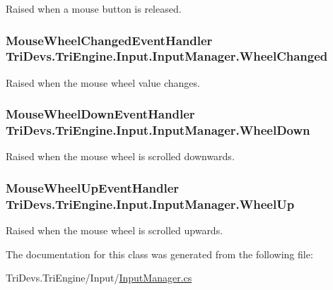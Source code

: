 Raised when a mouse button is released. 

\hypertarget{class_tri_devs_1_1_tri_engine_1_1_input_1_1_input_manager_aac9309268ee75ae4e5b29fde1ba7aec6}{
\subsubsection[{Wheel\-Changed}]{\setlength{\rightskip}{0pt plus 5cm}Mouse\-Wheel\-Changed\-Event\-Handler Tri\-Devs.\-Tri\-Engine.\-Input.\-Input\-Manager.\-Wheel\-Changed}}\label{class_tri_devs_1_1_tri_engine_1_1_input_1_1_input_manager_aac9309268ee75ae4e5b29fde1ba7aec6}


Raised when the mouse wheel value changes. 

\hypertarget{class_tri_devs_1_1_tri_engine_1_1_input_1_1_input_manager_afa12da645454a4dcdcb5903a98fe5837}{
\subsubsection[{Wheel\-Down}]{\setlength{\rightskip}{0pt plus 5cm}Mouse\-Wheel\-Down\-Event\-Handler Tri\-Devs.\-Tri\-Engine.\-Input.\-Input\-Manager.\-Wheel\-Down}}\label{class_tri_devs_1_1_tri_engine_1_1_input_1_1_input_manager_afa12da645454a4dcdcb5903a98fe5837}


Raised when the mouse wheel is scrolled downwards. 

\hypertarget{class_tri_devs_1_1_tri_engine_1_1_input_1_1_input_manager_a7eea546931e66d7955df875eb9c3b8f9}{
\subsubsection[{Wheel\-Up}]{\setlength{\rightskip}{0pt plus 5cm}Mouse\-Wheel\-Up\-Event\-Handler Tri\-Devs.\-Tri\-Engine.\-Input.\-Input\-Manager.\-Wheel\-Up}}\label{class_tri_devs_1_1_tri_engine_1_1_input_1_1_input_manager_a7eea546931e66d7955df875eb9c3b8f9}


Raised when the mouse wheel is scrolled upwards. 



The documentation for this class was generated from the following file\-:\begin{DoxyCompactItemize}
\item 
Tri\-Devs.\-Tri\-Engine/\-Input/\hyperlink{_input_manager_8cs}{Input\-Manager.\-cs}\end{DoxyCompactItemize}
